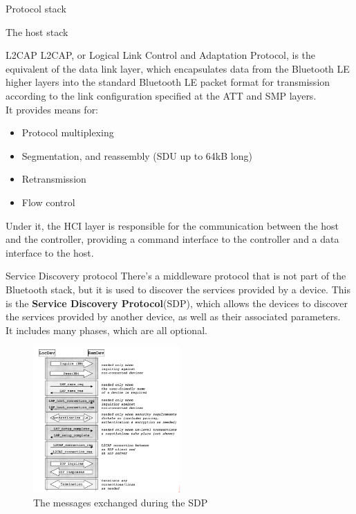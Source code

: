 \begin{section}{Protocol stack}
\begin{subsection}{The host stack}
    \begin{subsubsection}{L2CAP}
      L2CAP, or Logical Link Control and Adaptation Protocol, is the equivalent of the data link layer,
      which encapsulates data from the Bluetooth LE higher layers into the standard Bluetooth LE
      packet format for transmission according to the link configuration specified at the ATT and
      SMP layers.\\
      It provides means for:
      \begin{itemize}
        \item Protocol multiplexing
        \item Segmentation, and reassembly (SDU up to 64kB long)
        \item Retransmission
        \item Flow control
      \end{itemize}
      Under it, the HCI layer is responsible for the communication between the host and the
      controller, providing a command interface to the controller and a data interface to the host.

    \end{subsubsection}

  \end{subsection}
  \begin{subsection}{Service Discovery protocol}
    There's a middleware protocol that is not part of the Bluetooth stack, but it is used to discover
    the services provided by a device. This is the \textbf{Service Discovery Protocol}(SDP), which
    allows the devices to discover the services provided by another device, as well as their 
    associated parameters.\\
    It includes many phases, which are all optional.
    \begin{figure}[H]
      \centering
      \includegraphics[width=0.5\textwidth]{img/wireless/bluetooth sdp.png}
      \caption{The messages exchanged during the SDP}
    \end{figure}
  \end{subsection}


\end{section}
